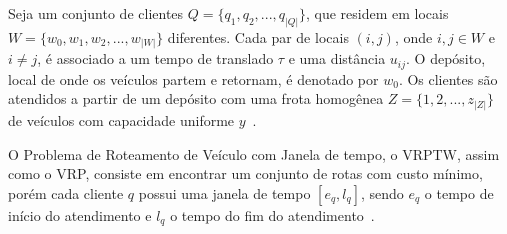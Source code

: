 Seja um conjunto de clientes $Q = \{q_1, q_2, ..., q_{|Q|}\}$, que residem em locais $W = \{w_0, w_1, w_2, ..., w_{|W|}\}$ diferentes. Cada par de locais $(i,j)$, onde  $i,j \in W$ e $i \neq j$, é associado a um tempo de translado $\tau$ e uma distância $u_{ij}$. O depósito, local de onde os veículos partem e retornam, é denotado por $w_0$.
Os clientes são atendidos a partir de um depósito com uma frota  homogênea $Z = \{1, 2, ..., z_{|Z|}\}$ de veículos com capacidade uniforme $y$~\cite{gold:2008}.

O Problema de Roteamento de Veículo com Janela de tempo, o \ac{VRPTW}, assim como o \ac{VRP}, consiste em encontrar um conjunto de rotas com custo mínimo, porém cada cliente $q$ possui uma janela de tempo $[e_{q}, l_{q}]$, sendo $e_{q}$ o tempo de início do atendimento e $l_{q}$ o tempo do fim do atendimento~\cite{gold:2008}.